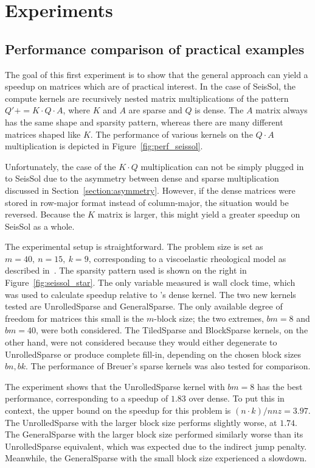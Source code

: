 
\chapter{Experiments}
\label{chapter:experiments}


\section{Performance comparison of practical examples}
\label{section:exp_seissol_star}

The goal of this first experiment is to show that the general approach can yield a speedup on matrices which are of practical interest. In the case of SeisSol, the compute kernels are recursively nested matrix multiplications of the pattern $Q' \mathrel{{+}{=}} K \cdot Q \cdot A$, where $K$ and $A$ are sparse and $Q$ is dense. The $A$ matrix always has the same shape and sparsity pattern, whereas there are many different matrices shaped like $K$. The performance of various kernels on the $Q \cdot A$ multiplication is depicted in Figure~\ref{fig:perf_seissol}. 

Unfortunately, the case of the $K \cdot Q$ multiplication can not be simply plugged in to SeisSol due to the asymmetry between dense and sparse multiplication discussed in Section~\ref{section:asymmetry}. However, if the dense matrices were stored in row-major format instead of column-major, the situation would be reversed. Because the $K$ matrix is larger, this might yield a greater speedup on SeisSol as a whole.


The experimental setup is straightforward. The problem size is set as $m=40,~n=15,~k=9$, corresponding to a viscoelastic rheological model as described in~\cite{7568431}. The sparsity pattern used is shown on the right in Figure~\ref{fig:seissol_star}. The only variable measured is wall clock time, which was used to calculate speedup relative to 's dense kernel. The two new kernels tested are UnrolledSparse and GeneralSparse. The only available degree of freedom for matrices this small is the $m$-block size; the two extremes, $bm=8$ and $bm=40$, were both considered. The TiledSparse and BlockSparse kernels, on the other hand, were not considered because they would either degenerate to UnrolledSparse or produce complete fill-in, depending on the chosen block sizes $bn, bk$. The performance of Breuer's sparse kernels was also tested for comparison. 


The experiment shows that the UnrolledSparse kernel with $bm=8$ has the best performance, corresponding to a speedup of $1.83$ over dense. To put this in context, the upper bound on the speedup for this problem is $(n\cdot k)/nnz = 3.97$. The UnrolledSparse with the larger block size performs slightly worse, at $1.74$. The GeneralSparse with the larger block size performed similarly worse than its UnrolledSparse equivalent, which was expected due to the indirect jump penalty. Meanwhile, the GeneralSparse with the small block size experienced a slowdown. 

